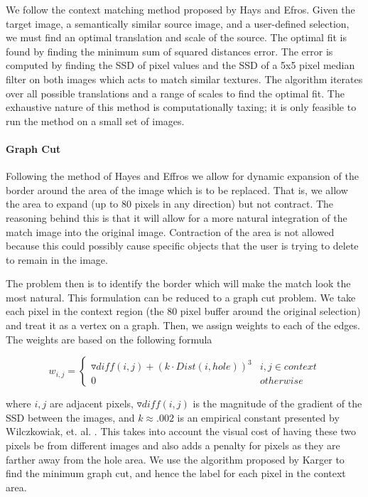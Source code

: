 \documentclass[11pt]{amsart}
\begin{document}
We follow the context matching method proposed by Hays and Efros.\cite{Hays:2007} Given the target image, a semantically similar source image, and a user-defined selection, we must find an optimal translation and scale of the source. The optimal fit is found by finding the minimum sum of squared distances error. The error is computed by finding the SSD of pixel values and the SSD of a 5x5 pixel median filter on both images which acts to match similar textures. The algorithm iterates over all possible translations and a range of scales to find the optimal fit. The exhaustive nature of this method is computationally taxing; it is only feasible to run the method on a small set of images.


\paragraph{\sc Graph Cut}

Following the method of Hayes and Effros \cite{Hays:2007} we allow for dynamic expansion of the border around the area of the image which is to be replaced. That is, we allow the area to expand (up to 80 pixels in any direction) but not contract. The reasoning behind this is that it will allow for a more natural integration of the match image into the original image. Contraction of the area is not allowed because this could possibly cause specific objects that the user is trying to delete to remain in the image. 


The problem then is to identify the border which will make the match look the most natural. This formulation can be reduced to a graph cut problem. We take each pixel in the context region (the 80 pixel buffer around the original selection) and treat it as a vertex on a graph. Then, we assign weights to each of the edges. The weights are based on the following formula

\begin{displaymath}
	w_{i,j} = \left\{ 
		\begin{array}{lr}
			\triangledown diff(i,j) + (k \cdot Dist(i,hole))^3 &  i,j \in context \\
			0 &  otherwise
		\end{array}
	\right.
\end{displaymath}

where $i,j$ are adjacent pixels, $\triangledown diff(i,j)$ is the magnitude of the gradient of the SSD between the images, and $k \approx .002$ is an empirical constant presented by Wilczkowiak, et. al. \cite{Gabriel:2005}. This takes into account the visual cost of having these two pixels be from different images and also adds a penalty for pixels as they are farther away from the hole area. We use the algorithm proposed by Karger \cite{Karger:1992} to find the minimum graph cut, and hence the label for each pixel in the context area.
\end{document}

